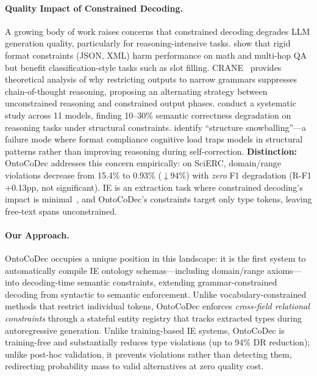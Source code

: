 \paragraph{Quality Impact of Constrained Decoding.}
A growing body of work raises concerns that constrained decoding degrades LLM generation quality, particularly for reasoning-intensive tasks.
%
\citet{tam2024letmespeak} show that rigid format constraints (JSON, XML) harm performance on math and multi-hop QA but benefit classification-style tasks such as slot filling.
%
CRANE~\cite{banerjee2025crane} provides theoretical analysis of why restricting outputs to narrow grammars suppresses chain-of-thought reasoning, proposing an alternating strategy between unconstrained reasoning and constrained output phases.
%
\citet{schall2025hiddencost} conduct a systematic study across 11 models, finding 10--30\% semantic correctness degradation on reasoning tasks under structural constraints.
%
\citet{zhou2026snowballing} identify ``structure snowballing''---a failure mode where format compliance cognitive load traps models in structural patterns rather than improving reasoning during self-correction.
%
\textbf{Distinction:} OntoCoDec addresses this concern empirically: on SciERC, domain/range violations decrease from 15.4\% to 0.93\% ($\downarrow$94\%) with \emph{zero} F1 degradation (R-F1 +0.13pp, not significant). IE is an extraction task where constrained decoding's impact is minimal~\cite{tam2024letmespeak}, and OntoCoDec's constraints target only type tokens, leaving free-text spans unconstrained.


\paragraph{Our Approach.}
OntoCoDec occupies a unique position in this landscape: it is the first system to automatically compile IE ontology schemas---including domain/range axioms---into decoding-time semantic constraints, extending grammar-constrained decoding from syntactic to semantic enforcement.
%
Unlike vocabulary-constrained methods that restrict individual tokens, OntoCoDec enforces \emph{cross-field relational constraints} through a stateful entity registry that tracks extracted types during autoregressive generation.
%
Unlike training-based IE systems, OntoCoDec is training-free and substantially reduces type violations (up to 94\% DR reduction); unlike post-hoc validation, it prevents violations rather than detecting them, redirecting probability mass to valid alternatives at zero quality cost.
